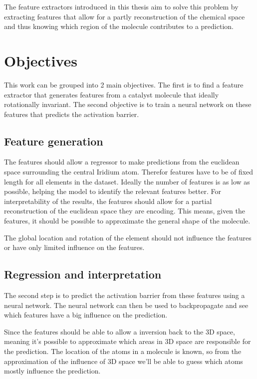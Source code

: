 The feature extractors introduced in this thesis aim to solve this problem by extracting features that allow for a
partly reconstruction of the chemical space and thus knowing which region of the molecule contributes to a prediction.


\section{Objectives}

This work can be grouped into 2 main objectives. 
The first is to find a feature extractor that generates features from a catalyst molecule that ideally rotationally invariant.
The second objective is to train a neural network on these features that predicts the activation barrier.

\subsection{Feature generation}

The features should allow a regressor to make predictions from the euclidean space surrounding the central Iridium atom.
Therefor features have to be of fixed length for all elements in the dataset.
Ideally the number of features is as low as possible, helping the model to identify the relevant features better.
For interpretability of the results, the features should allow for a partial reconstruction of the euclidean space they are encoding.
This means, given the features, it should be possible to approximate the general shape of the molecule.

The global location and rotation of the element should not influence the features or have only limited influence on the features.

\subsection{Regression and interpretation}

The second step is to predict the activation barrier from these features using a neural network.
The neural network can then be used to backpropagate and see which features have a big influence on the prediction.

Since the features should be able to allow a inversion back to the 3D space, meaning it's possible to approximate which areas in 3D space are responsible for the prediction.
The location of the atoms in a molecule is known, so from the approximation of the influence of 3D space we'll be able to guess which atoms mostly influence the prediction.
